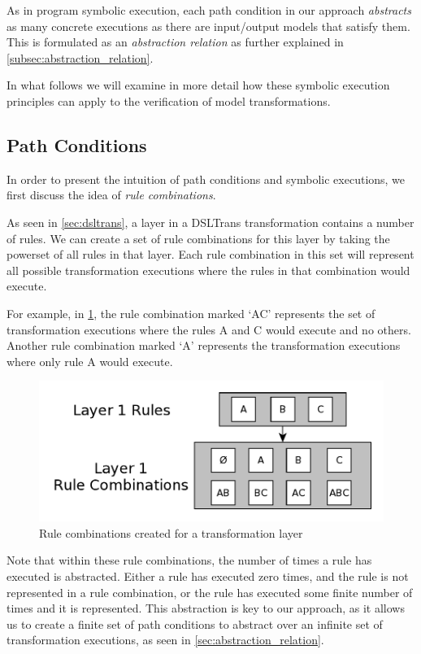 As in program symbolic execution, each path condition in our approach \emph{abstracts} as many concrete executions as there are input/output models
that satisfy them. This is formulated as an \emph{abstraction relation} as further explained in \cref{subsec:abstraction_relation}.

In what follows we will examine in more detail how these symbolic execution
principles can apply to the verification of model transformations.


\subsection{Path Conditions}
\label{sec:gen_path_conds}

In order to present the intuition of path conditions and symbolic executions, we
first discuss the idea of \textit{rule combinations}.

As seen in \cref{sec:dsltrans}, a layer in a DSLTrans transformation contains a
number of rules.  We can create a set of rule combinations for this layer by
taking the powerset of all rules in that layer. Each rule combination in this
set will represent all possible transformation executions where the rules in
that combination would execute.

For example, in \cref{fig:rule_combos2}, the rule combination marked `AC'
represents the set of transformation executions where the rules A and C would
execute and no others. Another rule combination marked `A' represents the
transformation executions where only rule A would execute.

\begin{figure}[h!] \centering \includegraphics[width=.40\textwidth]{./figures/overview/rule_combos.pdf}
	\caption{Rule combinations created for a transformation layer}
	\label{fig:rule_combos2}
\end{figure}

Note that within these rule combinations, the number of times a rule has
executed is abstracted. Either a rule has executed zero times, and the rule is
not represented in a rule combination, or the rule has executed some finite
number of times and it is represented. This abstraction is key to our approach,
as it allows us to create a finite set of path conditions to abstract over an
infinite set of transformation executions, as seen in
\cref{sec:abstraction_relation}.

